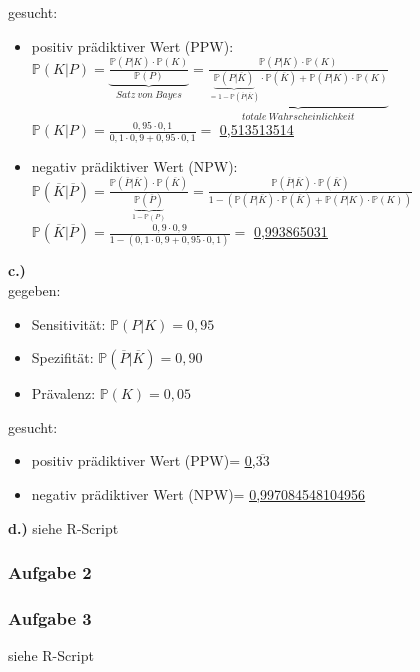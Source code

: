 gesucht:\\
\begin{itemize}
	\item positiv prädiktiver Wert (PPW): \\
	$\mathbb{P}(K|P) = \underbrace{\frac{\mathbb{P}(P|K) \cdot \mathbb{P}(K)}{\mathbb{P}(P)}}_{Satz\ von\ Bayes} = \underbrace{\frac{\mathbb{P}(P|K) \cdot \mathbb{P}(K)}{\underbrace{\mathbb{P}(P|\overline{K})}_{=1-\mathbb{P}(\overline{P}|\overline{K})} \cdot \mathbb{P}(\overline{K}) + \mathbb{P}(P|K) \cdot \mathbb{P}(K)}}_{totale\ Wahrscheinlichkeit}$\\
	$\mathbb{P}(K|P) = \frac{0,95 \cdot 0,1}{0,1 \cdot 0,9 + 0,95 \cdot 0,1} = $ \underline{\underline{0,513513514}}
	\item negativ prädiktiver Wert (NPW):\\
	$\mathbb{P}(\overline{K}|\overline{P})= \frac{\mathbb{P}(\overline{P}|\overline{K}) \cdot \mathbb{P}(\overline{K})}{\underbrace{\mathbb{P}(\overline{P})}_{1-\mathbb{P}(P)}} = \frac{\mathbb{P}(\overline{P}|\overline{K}) \cdot \mathbb{P}(\overline{K})}{1 - (\mathbb{P}(P|\overline{K}) \cdot \mathbb{P}(\overline{K}) + \mathbb{P}(P|K) \cdot \mathbb{P}(K))}$\\
	$\mathbb{P}(\overline{K}|\overline{P})= \frac{0,9 \cdot 0,9}{1-(0,1 \cdot 0,9 + 0,95 \cdot 0,1)} =$ \underline{\underline{0,993865031}}
\end{itemize}

\textbf{c.)}
\\
gegeben:
\begin{itemize}
	\item Sensitivität: $\mathbb{P}(P|K)=0,95$
	\item Spezifität: $\mathbb{P}(\overline{P}|\overline{K})=0,90$
	\item Prävalenz: $\mathbb{P}(K)=0,05$
\end{itemize}

gesucht:\\
\begin{itemize}
	\item positiv prädiktiver Wert (PPW)= \underline{\underline{0,$\overline{33}$}}
	\item negativ prädiktiver Wert (NPW)= \underline{\underline{0,997084548104956}}
\end{itemize}

\textbf{d.)}
siehe R-Script

\subsubsection{Aufgabe 2}

\subsubsection{Aufgabe 3}
siehe R-Script
